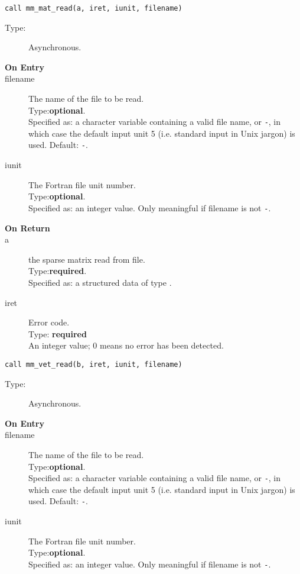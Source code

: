 
\clearpage{}

\begin{lstlisting}
call mm_mat_read(a, iret, iunit, filename)
\end{lstlisting}

\begin{description}
\item[Type:] Asynchronous.
\item[\bf  On Entry ]
\item[filename] The name of the file to be read.\\
Type:{\bf optional}.\\
Specified as: a character variable containing a valid file name, or
\verb|-|, in which case the default input unit  5 (i.e. standard input
in Unix jargon) is used. Default: \verb|-|. 
\item[iunit] The Fortran file unit number.\\
Type:{\bf optional}.\\
Specified as: an integer value. Only meaningful if filename is not \verb|-|.
\end{description}

\begin{description}
\item[\bf On Return]
\item[a] the sparse matrix read from file.\\
Type:{\bf required}.\\
Specified as: a structured data of type \spdata.
\item[iret] Error code.\\
Type: {\bf required} \\
An integer value; 0 means no error has been detected. 
\end{description}

\clearpage{}
\begin{lstlisting}
call mm_vet_read(b, iret, iunit, filename)
\end{lstlisting}

\begin{description}
\item[Type:] Asynchronous.
\item[\bf  On Entry ]
\item[filename] The name of the file to be read.\\
Type:{\bf optional}.\\
Specified as: a character variable containing a valid file name, or
\verb|-|, in which case the default input unit  5 (i.e. standard input
in Unix jargon) is used. Default: \verb|-|. 
\item[iunit] The Fortran file unit number.\\
Type:{\bf optional}.\\
Specified as: an integer value. Only meaningful if filename is not \verb|-|.
\end{description}


